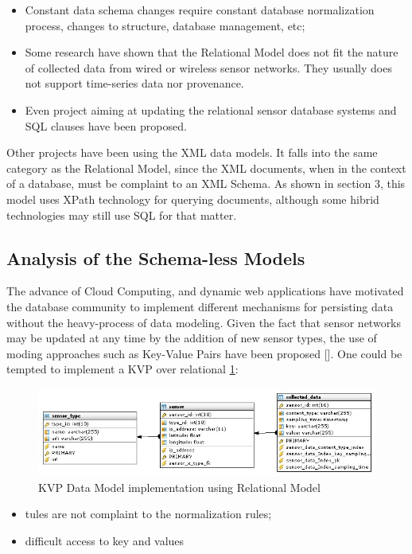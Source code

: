 \begin{itemize}
  \item Constant data schema changes require constant database normalization
  process, changes to structure, database management, etc;
  \item Some research have shown that the Relational Model does not fit the
  nature of collected data from wired or wireless sensor networks. They usually
  does not support time-series data nor provenance.
  \item Even project aiming at updating the relational sensor database systems
  and SQL clauses have been proposed. 
\end{itemize}

Other projects have been using the XML data models. It falls into the same
category as the Relational Model, since the XML documents, when in the context
of a database, must be complaint to an XML Schema. As shown in section 3, this
model uses XPath technology for querying documents, although some hibrid
technologies may still use SQL for that matter.

\subsection{Analysis of the Schema-less Models}

The advance of Cloud Computing, and dynamic web applications have motivated the
database community to implement different mechanisms for persisting data
without the heavy-process of data modeling. Given the fact that sensor networks
may be updated at any time by the addition of new sensor types, the use of
moding approaches such as Key-Value Pairs have been proposed []. One could be
tempted to implement a KVP over relational \ref{fig:KVP-on-Relational-Model}:

\begin{figure}
  \centering
  \includegraphics[scale=0.65]{../diagrams/KVP-on-Relational-Model}
  \caption{KVP Data Model implementation using Relational Model}
  \label{fig:KVP-on-Relational-Model}
\end{figure}

\begin{itemize}
  \item tules are not complaint to the normalization rules;
  \item difficult access to key and values
\end{itemize}

